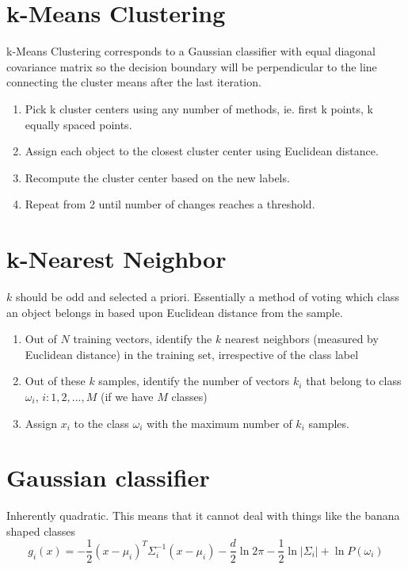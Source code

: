 \documentclass[11pt]{report}
\begin{document}
\section*{k-Means Clustering}
k-Means Clustering corresponds to a Gaussian classifier with equal diagonal covariance matrix so the decision boundary will be perpendicular to the line connecting the cluster means after the last iteration.

\begin{enumerate}
	\item Pick k cluster centers using any number of methods, ie. first k points, k equally spaced points.
	\item Assign each object to the closest cluster center using Euclidean distance.
	\item Recompute the cluster center based on the new labels.
	\item Repeat from 2 until number of changes reaches a threshold.
\end{enumerate}

\section*{k-Nearest Neighbor}
$k$ should be odd and selected a priori. Essentially a method of voting which class an object belongs in based upon Euclidean distance from the sample.
\begin{enumerate}
	\item Out of $N$ training vectors, identify the $k$ nearest neighbors (measured by Euclidean distance) in the training set, irrespective of the class label
	\item Out of these $k$ samples, identify the number of vectors $k_i$ that belong to class $\omega_i$, $i:1,2,...,M$ (if we have $M$ classes)
	\item Assign $x_i$ to the class $\omega_i$ with the maximum number of $k_i$ samples.
\end{enumerate}

\section*{Gaussian classifier}
Inherently quadratic. This means that it cannot deal with things like the banana shaped classes
\begin{equation}
	g_i(x) = -\frac{1}{2}(x-\mu_i)^T\Sigma_i^{-1}(x-\mu_i)-\frac{d}{2}\ln2\pi -\frac{1}{2}\ln|\Sigma_i|+\ln P(\omega_i)
\end{equation}
\end{document}
